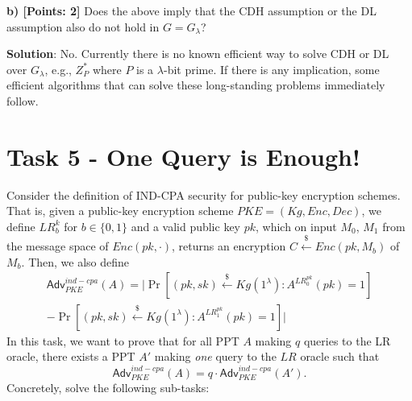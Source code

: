 \documentclass[12pt]{article}
\newcommand{\bits}{\{0,1\}}
\newcommand{\getsr}{\stackrel{\$}{\gets}}
\newcommand{\Adv}{\textsf{Adv}}
\theoremstyle{definition}
\begin{document}
{\bf b) [Points: 2]} Does the above imply that the CDH assumption or the DL assumption also do not hold in $G = G_\lambda$?

{\bf Solution}: No. Currently there is no known efficient way to solve CDH or DL over $G_\lambda$, e.g., $Z_P^*$ where $P$ is a $\lambda$-bit prime. If there is any implication, some efficient algorithms that can solve these long-standing problems immediately follow.

\section{Task 5 - One Query is Enough!}
Consider the definition of IND-CPA security for public-key encryption schemes. That is,
given a public-key encryption scheme $PKE = (Kg, Enc, Dec)$, we define $LR_b^k$ for $b\in\bits$ and a valid public key $pk$, which on input $M_0$, $M_1$ from the message space of $Enc(pk,\cdot)$, returns an encryption $C \getsr Enc(pk, M_b)$ of $M_b$. Then, we also define
$$\begin{aligned}
\Adv_{PKE}^{ind-cpa}(A) = \bigg| \Pr[(pk,sk)\getsr Kg(1^\lambda) : A^{LR_0^{pk}}(pk)=1] \\
-\Pr[(pk,sk)\getsr Kg(1^\lambda) : A^{LR_1^{pk}}(pk)=1] \bigg|
\end{aligned}$$
In this task, we want to prove that for all PPT $A$ making $q$ queries to the LR oracle, there exists a PPT $A'$ making \emph{one} query to the $LR$ oracle such that
\begin{equation}
\label{eq:1}
\Adv_{PKE}^{ind-cpa}(A) = q \cdot \Adv_{PKE}^{ind-cpa}(A').
\end{equation}
Concretely, solve the following sub-tasks:
\end{document}
